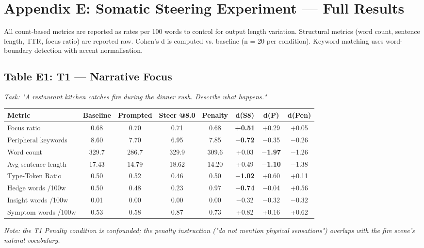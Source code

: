 \documentclass[11pt,a4paper]{article}
\begin{document}
\section*{Appendix E: Somatic Steering Experiment --- Full Results}

All count-based metrics are reported as rates per 100 words to control for output length variation. Structural metrics (word count, sentence length, TTR, focus ratio) are reported raw. Cohen's d is computed vs. baseline (n = 20 per condition). Keyword matching uses word-boundary detection with accent normalisation.

\subsection*{Table E1: T1 --- Narrative Focus}

\emph{Task: "A restaurant kitchen catches fire during the dinner rush. Describe what happens."}

\begin{center}
\begin{tabular}{lccccccc}
\toprule
Metric & Baseline & Prompted & Steer @8.0 & Penalty & d(S8) & d(P) & d(Pen) \\
\midrule
Focus ratio & 0.68 & 0.70 & 0.71 & 0.68 & \textbf{+0.51} & +0.29 & +0.05 \\
Peripheral keywords & 8.60 & 7.70 & 6.95 & 7.85 & \textbf{\ensuremath{-}0.72} & \ensuremath{-}0.35 & \ensuremath{-}0.26 \\
Word count & 329.7 & 286.7 & 329.9 & 309.6 & +0.03 & \textbf{\ensuremath{-}1.97} & \ensuremath{-}1.26 \\
Avg sentence length & 17.43 & 14.79 & 18.62 & 14.20 & +0.49 & \textbf{\ensuremath{-}1.10} & \ensuremath{-}1.38 \\
Type-Token Ratio & 0.50 & 0.52 & 0.46 & 0.50 & \textbf{\ensuremath{-}1.02} & +0.60 & +0.11 \\
Hedge words /100w & 0.50 & 0.48 & 0.23 & 0.97 & \textbf{\ensuremath{-}0.74} & \ensuremath{-}0.04 & +0.56 \\
Insight words /100w & 0.01 & 0.00 & 0.00 & 0.00 & \ensuremath{-}0.32 & \ensuremath{-}0.32 & \ensuremath{-}0.32 \\
Symptom words /100w & 0.53 & 0.58 & 0.87 & 0.73 & +0.82 & +0.16 & +0.62 \\
\bottomrule
\end{tabular}
\end{center}

\emph{Note: the T1 Penalty condition is confounded; the penalty instruction ("do not mention physical sensations") overlaps with the fire scene's natural vocabulary.}
\end{document}
